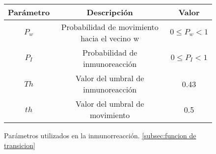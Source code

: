 \begin{table}[!ht]
\begin{center}
\vspace*{-0.5cm}
\end{center}
\caption[Par\'ametros de la construcci\'on de la red utilizados por el modelo Watts-Strogatz]{Par\'ametros de la construcci\'on de la red utilizados por el modelo Watts-Strogatz.}
\label{table-network-params}
\end{table}

\begin{figure}[h!]%
    \begin{center}
        \begin{tabular}{|c|c|c|} \hline
        Par\'ametro & Descripci\'on  	                       & Valor 	\\ \hline
        $P_w$       & Probabilidad de movimiento hacia el vecino w&$0 \leq P_w  < 1  $			\\ \hline
        $P_I$ 	    & Probabilidad de inmunoreacci\'on         &$0 \leq P_I  < 1  $			\\ \hline
        $Th$		& Valor del umbral de inmunoreacci\'on     & 0.43			\\ \hline
        $th$		& Valor del umbral de movimiento           & 0.5 			\\ \hline
        \end{tabular}
    \caption{Par\'ametros utilizados en la inmunorreacci\'on. \label{fig:inmune_param}\ref{subsec:funcion de transicion}}
    \end{center}
    \end{figure}

